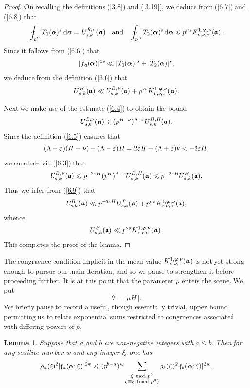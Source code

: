 \documentclass[12pt,reqno]{amsart}
\newtheorem{lemma}[theorem]{Lemma}
\theoremstyle{definition}
\theoremstyle{remark}
\numberwithin{equation}{section}
\newcommand{\mmod}[1]{\,\,(\text{\rm mod}\,\,#1)}
\newcommand{\nmod}[1]{\,\,\text{\rm mod}\,\,#1}
\def\grf{{\mathfrak f}}\def\grF{{\mathfrak F}}
\def\zet{{\zeta}} \def\bfzet{{\boldsymbol \zeta}} \def\zetbar{{\overline \zet}}
\def\tet{{\theta}} \def\bftet{{\boldsymbol \theta}}
\def\eps{\varepsilon}
\def\le{\leqslant} \def\ge{\geqslant} \def\pleq{\preccurlyeq} \def\ple{\prec}
\def\d{{\,{\rm d}}}
\begin{document}
\begin{proof}
\par On recalling the definitions (\ref{3.8}) and (\ref{3.19}), we deduce from (\ref{6.7}) 
and (\ref{6.8}) that
$$\oint_{p^B}T_1(\bfalp)^s\d\bfalp =U_{s,k}^{B,\nu}(\bfgra)\quad \text{and}\quad 
\oint_{p^B}T_2(\bfalp)^s\d\bfalp \le p^{\nu s}K_{\nu,\nu,c}^{1,\bfvarphi,\nu}
(\bfgra).$$
Since it follows from (\ref{6.6}) that
$$|f_{\boldsymbol {{\mathfrak a}}}({\boldsymbol \alpha})|^{2s}\ll |T_1({\boldsymbol \alpha})|^s+|T_2({\boldsymbol \alpha})|^s,$$
we deduce from the definition (\ref{3.6}) that
\begin{equation}\label{6.9}
U_{s,k}^B({\boldsymbol {{\mathfrak a}}})\ll U_{s,k}^{B,\nu}({\boldsymbol {{\mathfrak a}}})+p^{\nu s}
K_{\nu,\nu,c}^{1,{\boldsymbol \varphi},\nu}({\boldsymbol {{\mathfrak a}}}).
\end{equation}

\par Next we make use of the estimate (\ref{6.4}) to obtain the bound
$$U_{s,k}^{B,\nu}(\bfgra)\le (p^{H-\nu})^{\Lam+\eps}U_{s,k}^{B,H}(\bfgra).$$
Since the definition (\ref{6.5}) ensures that
$$(\Lam+\eps)(H-\nu)-(\Lam-\eps)H=2\eps H-(\Lam+\eps)\nu<-2\eps H,$$
we conclude via (\ref{6.3}) that
$$U_{s,k}^{B,\nu}(\bfgra)\le p^{-2\eps H}(p^H)^{\Lam-\eps}U_{s,k}^{B,H}(\bfgra)
\le p^{-2\eps H}U_{s,k}^B(\bfgra).$$
Thus we infer from (\ref{6.9}) that
$$U_{s,k}^B(\bfgra)\ll p^{-2\eps H}U_{s,k}^B(\bfgra)+p^{\nu s}
K_{\nu,\nu,c}^{1,\bfvarphi,\nu}(\bfgra),$$
whence
$$U_{s,k}^B({\boldsymbol {{\mathfrak a}}})\ll p^{\nu s}K_{\nu,\nu,c}^{1,{\boldsymbol \varphi},\nu}({\boldsymbol {{\mathfrak a}}}).$$
This completes the proof of the lemma.
\end{proof}

The congruence condition implicit in the mean value 
$K_{\nu,\nu,c}^{1,{\boldsymbol \varphi},\nu}({\boldsymbol {{\mathfrak a}}})$ is not yet strong enough to pursue our main 
iteration, and so we pause to strengthen it before proceeding further. It is at this point that 
the parameter $\mu$ enters the scene. We put
\begin{equation}\label{6.10}
\tet=\lceil \mu H\rceil .
\end{equation}
We briefly pause to record a useful, though essentially trivial, upper bound permitting us to 
relate exponential sums restricted to congruences associated with differing powers of $p$.

\begin{lemma}\label{lemma6.2} Suppose that $a$ and $b$ are non-negative integers 
with $a\le b$. Then for any positive number $w$ and any integer $\xi$, one has
$$\rho_a(\xi)^2|\grf_a(\bfalp;\xi)|^{2w}\le (p^{b-a})^w
\sum_{\substack{\zet\nmod{p^b}\\ \zet\equiv \xi\mmod{p^a}}}\rho_b(\zet)^2
|\grf_b(\bfalp;\zet)|^{2w}.$$
\end{lemma}
\end{document}
